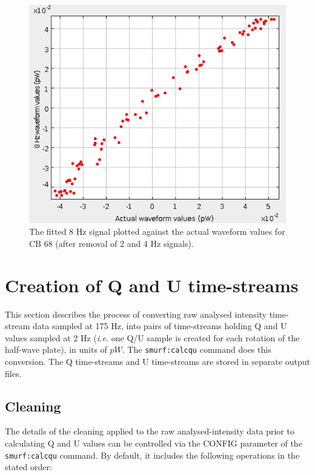 \documentclass[twoside,11pt]{starlink}
\begin{document}
\begin{figure}
\includegraphics[width=\columnwidth]{cb68-scat}
\caption{The fitted 8 Hz signal plotted against the actual waveform values for
CB 68 (after removal of 2 and 4 Hz signals).}
\label{fig:cb68-scat}
\end{figure}





\section{Creation of  Q and U time-streams}

This section describes the process of converting raw analysed intensity
time-stream data sampled at 175 Hz, into pairs of time-streams holding  Q
and U values sampled at 2 Hz (\emph{i.e.} one Q/U sample is created for
each rotation of the half-wave plate), in units of $pW$. The \texttt{smurf:calcqu}
command does this conversion. The Q time-streams and U time-streams
are stored in separate output files.

\subsection{Cleaning}

The details of the cleaning applied to the raw analysed-intensity data prior
to calculating Q and U values can be controlled via the CONFIG parameter
of the \texttt{smurf:calcqu} command. By default, it includes the
following operations in the stated order:
\end{document}
